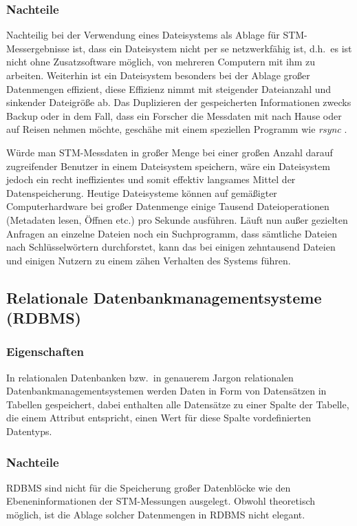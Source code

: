 \documentclass[12pt,ngerman,a4]{scrartcl}
\newcommand{\pquote}[1]{\glqq #1\grqq}
\begin{document}
\subsubsection{Nachteile}
Nachteilig bei der Verwendung eines Dateisystems als Ablage für STM-\linebreak Messergebnisse ist, dass ein Dateisystem nicht per se netzwerkfähig ist, d.h.\ es ist nicht ohne Zusatzsoftware möglich, von mehreren Computern mit ihm zu arbeiten. Weiterhin ist ein Dateisystem besonders bei der Ablage großer Datenmengen effizient, diese Effizienz nimmt mit steigender Dateianzahl und sinkender Dateigröße ab. Das Duplizieren der gespeicherten Informationen zwecks Backup oder in dem Fall, dass ein Forscher die Messdaten mit nach Hause oder auf Reisen nehmen möchte, geschähe mit einem speziellen Programm wie \emph{rsync} \cite{manrsync}.

Würde man STM-Messdaten in großer Menge bei einer großen Anzahl darauf zugreifender Benutzer in einem Dateisystem speichern, wäre ein Dateisystem jedoch ein recht ineffizientes und somit effektiv langsames Mittel der Datenspeicherung. Heutige Dateisysteme können auf gemäßigter Computerhardware bei großer Datenmenge einige Tausend Dateioperationen (Metadaten lesen, Öffnen etc.) pro Sekunde ausführen. %
Läuft nun außer gezielten Anfragen an einzelne Dateien noch ein Suchprogramm, %
dass sämtliche Dateien nach Schlüsselwörtern durchforstet, kann das bei einigen zehntausend Dateien und einigen Nutzern zu einem \pquote{zähen} Verhalten des Systems führen.
\subsection{Relationale Datenbankmanagementsysteme (RDBMS)}
\subsubsection{Eigenschaften}
In relationalen Datenbanken bzw.\ in genauerem Jargon relationalen Datenbankmanagementsystemen werden Daten in Form von Datensätzen in Tabellen gespeichert, dabei enthalten alle Datensätze zu einer \pquote{Spalte} der Tabelle, die einem Attribut entspricht, einen Wert für diese Spalte vordefinierten Datentyps.
\subsubsection{Nachteile}
RDBMS sind nicht für die Speicherung großer Datenblöcke wie den Ebeneninformationen der STM-Messungen ausgelegt. Obwohl theoretisch möglich, ist die Ablage solcher Datenmengen in RDBMS nicht elegant.
\end{document}

